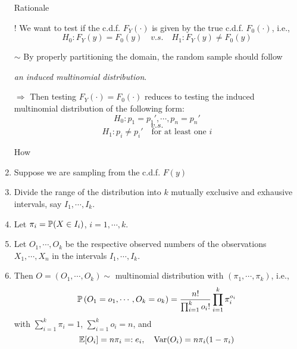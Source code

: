 \begin{frame}
	\begin{enumerate}
		\item[Rationale]
		\item[$!$] We want to test if the c.d.f. $F_Y(\cdot)$ is given by the true c.d.f. $F_0(\cdot)$, i.e., \\[1em]
			\[H_0:F_Y(y) = F_0(y)\quad v.s. \quad H_1: F_Y(y)\ne F_0(y)
			\]
			\vfill
		\item[$\sim$] By properly partitioning the domain, the random sample should follow
		\begin{center}
			\textcolor{yellow!80!black}{\it an induced multinomial distribution}.
		\end{center}
		\vfill
		\item[$\Longrightarrow$] Then testing $F_Y(\cdot)=F_0(\cdot)$ reduces to testing the induced multinomial distribution of the following form: \\[1em]
			\[
			H_0: p_1 = p_1', \cdots, p_n =p_n'
			\]
			\[
			v.s.
			\]
			\[
				H_1: p_i\ne p_i'\quad\text{for at least one $i$}
			\]
	\end{enumerate}
\end{frame}
\begin{frame}[fragile]

	\begin{enumerate}
		\item[How]
		\item Suppose we are sampling from the c.d.f. $F(y)$
			\vfill
		\item Divide the range of the distribution into $k$ mutually exclusive and exhausive intervals, say $I_1,\cdots, I_k$.
			\vfill
		\item Let $\pi_i = \mathbb{P}(X\in I_i)$, $i=1,\cdots, k$.
			\vfill
		\item Let $O_1,\cdots,O_k$ be the respective
			observed numbers of the observations $X_1,\cdots, X_n$ in
			the intervals $I_1,\cdots,I_k$.
			\vfill
		\item Then $O=(O_1,\cdots,O_k)\sim $ multinomial distribution with $(\pi_1,\cdots,\pi_k)$, i.e.,
			\[
				\mathbb{P}\left(O_1=o_1,\cdots, O_k=o_k \right )
				=\frac{n!}{\prod_{i=1}^k o_i!}\prod_{i=1}^k \pi_i^{o_i}
			\]
			with  $\sum_{i=1}^k \pi_i=1$, $\sum_{i=1}^k o_i = n$, and
			\[
				\mathbb{E}[O_i] = n\pi_i =:e_i, \quad \text{Var}(O_i) = n \pi_i(1-\pi_i)
			\]
	\end{enumerate}
\end{frame}
